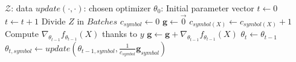 \begin{algorithm}
\caption{\tecname}\label{alg:DivideByTheGood}
\begin{algorithmic}[5]
                
\Require $\mathcal{Z}$: data
\Require $update(\cdot  , \cdot  )$: chosen optimizer
\Require $\theta_0$: Initial parameter vector 
\State $t \gets 0$
    $t \gets t + 1$
    \State Divide $Z$ in $Batches$
            \State $c_{symbol} \gets 0$
        \EndFor
        \State $\textbf{g} \gets \vec{0}$
            \State $c_{symbol(X)} \gets c_{symbol(X)} + 1$
            \State Compute $\nabla_{\theta_{t-1}} f_{\theta_{t-1}}(X)$ thanks to $y$
            \State $\textbf{g} \gets \textbf{g} + \nabla_{\theta_{t-1}} f_{\theta_{t-1}}(X)$ \Comment{\textbf{\textcolor{blue}{\small accumulate gradient}}}
        \EndFor
        \State $\theta_{t} \gets \theta_{t-1}$
              \Comment{\textcolor{blue}{\small \mainContrib}}
                \State $\theta_{t, symbol} \gets update(\theta_{t-1, symbol}, \frac{1}{c_{symbol}}\textbf{g}_{symbol})$ \Comment{\textbf{\textcolor{blue}{\small scaled gradient}}}
            \EndIf
        \EndFor
    \EndFor 
\EndWhile
\end{algorithmic}
\end{algorithm}











